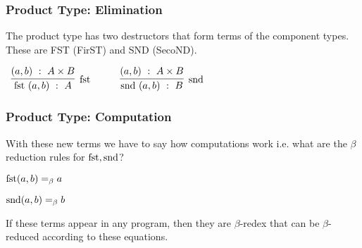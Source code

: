 \documentclass{beamer}
\theoremstyle{indentDefn} \newtheorem{defn}[]{Definition}
\begin{document}
\begin{frame}
  \frametitle{Product Type: Elimination}

  The product type has two destructors that form terms of the component types. These are FST (FirST) and SND (SecoND). 

  \begin{center}
    $\begin{array}{c c c}
      \infer[\text{\fst}]{\fst \ (a,b) \ : \ A}{(a,b) \ : \ A\times B}

      &
      \quad
      &

      \infer[\text{\snd}]{\snd \ (a,b) \ : \ B}{(a,b) \ : \ A\times B}

    \end{array}$
  \end{center}

\end{frame}

\begin{frame}
  \frametitle{Product Type: Computation}

  With these new terms we have to say how computations work i.e. what are the $\beta$ reduction rules for $\text{fst}, \text{snd}$?

  \begin{center}
    $\text{fst} (a,b) =_{\beta} a$ 

    $\text{snd} (a,b) =_{\beta} b$ 
  \end{center}

  If these terms appear in any program, then they are $\beta$-redex that can be $\beta$-reduced according to these equations.

\end{frame}




\end{document}
